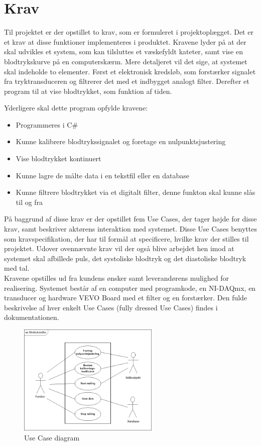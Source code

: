 \chapter{Krav}
Til projektet er der opstillet to krav, som er formuleret i projektoplægget. Det er et krav at disse funktioner implementeres i produktet. Kravene lyder på at der skal udvikles et system, som kan tilsluttes et væskefyldt kateter, samt vise en blodtrykskurve på en computerskærm. Mere detaljeret vil det sige, at systemet skal indeholde to elementer. Først et elektronisk kredsløb, som forstærker signalet fra tryktransduceren og filtrerer det med et indbygget analogt filter. Derefter et program til at vise blodtrykket, som funktion af tiden.

Yderligere skal dette program opfylde kravene:
\begin{itemize}
\item Programmeres i C\#
\item Kunne kalibrere blodtrykssignalet og foretage en nulpunktsjustering
\item Vise blodtrykket kontinuert
\item Kunne lagre de målte data i en tekstfil eller en database
\item Kunne filtrere blodtrykket via et digitalt filter, denne funkton skal kunne slås til og fra
\end{itemize}

På baggrund af disse krav er der opstillet fem Use Cases, der tager højde for disse krav, samt beskriver aktørens interaktion med systemet. Disse Use Cases benyttes som kravspecifikation, der har til formål at specificere, hvilke krav der stilles til projektet. Udover ovennævnte krav vil der også blive arbejdet hen imod at systemet skal afbillede puls, det systoliske blodtryk og det diastoliske blodtryk med tal. \\
Kravene opstilles ud fra kundens ønsker samt leverandørens mulighed for realisering. Systemet består af en computer med programkode, en NI-DAQmx, en transducer og hardware VEVO Board med et filter og en forstærker. Den fulde beskrivelse af hver enkelt Use Cases (fully dressed Use Cases) findes i dokumentationen. 

\begin{figure}[htb]
	\centering
	\includegraphics[width=0.6\textwidth]{Figurer/UseCasediagram}
	\caption{Use Case diagram}
\end{figure}

